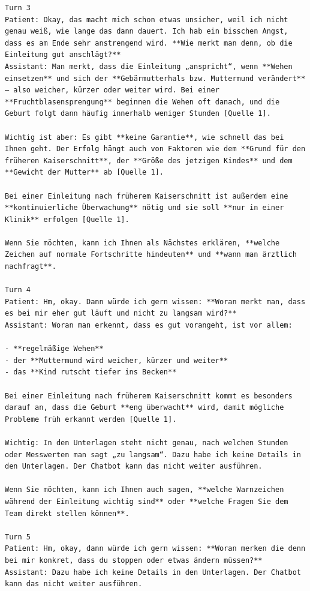 \begin{Verbatim}[fontsize=\small,breaklines=true,breakanywhere=true]
Turn 3
Patient: Okay, das macht mich schon etwas unsicher, weil ich nicht genau weiß, wie lange das dann dauert. Ich hab ein bisschen Angst, dass es am Ende sehr anstrengend wird. **Wie merkt man denn, ob die Einleitung gut anschlägt?**
Assistant: Man merkt, dass die Einleitung „anspricht“, wenn **Wehen einsetzen** und sich der **Gebärmutterhals bzw. Muttermund verändert** – also weicher, kürzer oder weiter wird. Bei einer **Fruchtblasensprengung** beginnen die Wehen oft danach, und die Geburt folgt dann häufig innerhalb weniger Stunden [Quelle 1].

Wichtig ist aber: Es gibt **keine Garantie**, wie schnell das bei Ihnen geht. Der Erfolg hängt auch von Faktoren wie dem **Grund für den früheren Kaiserschnitt**, der **Größe des jetzigen Kindes** und dem **Gewicht der Mutter** ab [Quelle 1].

Bei einer Einleitung nach früherem Kaiserschnitt ist außerdem eine **kontinuierliche Überwachung** nötig und sie soll **nur in einer Klinik** erfolgen [Quelle 1].

Wenn Sie möchten, kann ich Ihnen als Nächstes erklären, **welche Zeichen auf normale Fortschritte hindeuten** und **wann man ärztlich nachfragt**.

Turn 4
Patient: Hm, okay. Dann würde ich gern wissen: **Woran merkt man, dass es bei mir eher gut läuft und nicht zu langsam wird?**
Assistant: Woran man erkennt, dass es gut vorangeht, ist vor allem:

- **regelmäßige Wehen**
- der **Muttermund wird weicher, kürzer und weiter**
- das **Kind rutscht tiefer ins Becken**

Bei einer Einleitung nach früherem Kaiserschnitt kommt es besonders darauf an, dass die Geburt **eng überwacht** wird, damit mögliche Probleme früh erkannt werden [Quelle 1].  

Wichtig: In den Unterlagen steht nicht genau, nach welchen Stunden oder Messwerten man sagt „zu langsam“. Dazu habe ich keine Details in den Unterlagen. Der Chatbot kann das nicht weiter ausführen.

Wenn Sie möchten, kann ich Ihnen auch sagen, **welche Warnzeichen während der Einleitung wichtig sind** oder **welche Fragen Sie dem Team direkt stellen können**.

Turn 5
Patient: Hm, okay, dann würde ich gern wissen: **Woran merken die denn bei mir konkret, dass du stoppen oder etwas ändern müssen?**
Assistant: Dazu habe ich keine Details in den Unterlagen. Der Chatbot kann das nicht weiter ausführen.


\end{Verbatim}
